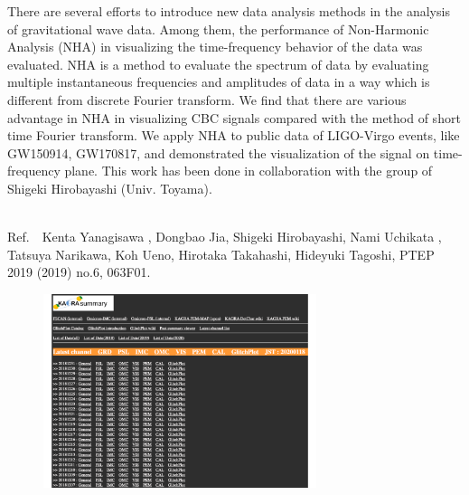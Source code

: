 There are several efforts to introduce new data analysis methods in the analysis of gravitational wave data. 
Among them, the performance of Non-Harmonic Analysis (NHA) in visualizing the time-frequency behavior 
of the data was evaluated. NHA is a method to evaluate the spectrum of data 
by evaluating multiple instantaneous frequencies and amplitudes of data in a way which is different from 
discrete Fourier transform. We find that there are various advantage in NHA in visualizing CBC signals 
compared with the method of short time Fourier transform. We apply NHA to public data of 
LIGO-Virgo events, like GW150914, GW170817, and demonstrated the visualization of the signal 
on time-frequency plane. This work has been done in collaboration with the group of Shigeki Hirobayashi
(Univ. Toyama). 

~\\
\noindent
Ref.~~Kenta Yanagisawa , Dongbao Jia, Shigeki Hirobayashi, Nami Uchikata , Tatsuya Narikawa, Koh Ueno, Hirotaka Takahashi, Hideyuki Tagoshi, PTEP 2019 (2019) no.6, 063F01.

\begin{figure} [hbtp]
\begin{center}
\includegraphics[width=8cm]{astrodiv/gw/das/fig/figdas.pdf}
\caption{\utsm {}}
\label{fig:KAGRA_DA_Sum}
\end{center}
\end{figure}


